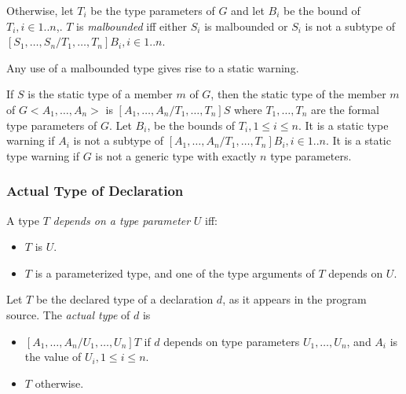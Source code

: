 \documentclass{article}
\begin{document}

\LMHash{}
Otherwise, let
 $T_i$ be the type parameters of $G$ and let $B_i$ be the bound of $T_i,  i \in 1.. n$,. $T$ is {\em malbounded} iff either $S_i$ is malbounded  or $S_i$ is not a subtype of $[S_1,  \ldots, S_n/T_1, \ldots, T_n]B_i,   i \in 1.. n$. 
 
 
\LMHash{}
Any use of a malbounded type gives rise to a static warning.

\LMHash{}
If $S$ is the static type of a member $m$ of $G$, then the static type of the member $m$ of  $G<A_1, \ldots, A_n>$  is $[A_1,  \ldots, A_n/T_1,  \ldots, T_n]S$ where $T_1,  \ldots, T_n$ are the formal type parameters of $G$.   Let $B_i$, be the bounds of $T_i, 1 \le i \le n$. It is a static type warning if $A_i$ is not a subtype of  $[A_1,  \ldots, A_n/T_1,  \ldots, T_n]B_i, i \in 1..n$. It is a static type warning if $G$ is not a generic type with exactly $n$ type parameters.





\subsubsection{Actual Type of Declaration}

\LMHash{}
A type $T$ {\em depends on a type parameter} $U$ iff:
\begin{itemize}
\item $T$ is $U$.
\item $T$ is a parameterized type, and one of the type arguments of $T$ depends on $U$.
\end{itemize}

\LMHash{}
Let $T$ be the declared type of a declaration $d$, as it appears in the program source. The {\em actual type} of $d$ is

\begin{itemize}
\item  $[A_1, \ldots, A_n/U_1, \ldots, U_n]T$ if $d$ depends on type parameters $U_1, \ldots, U_n$, and $A_i$ is the value of $U_i, 1 \le i \le n$.
\item $T$ otherwise.
\end{itemize}
\end{document}
